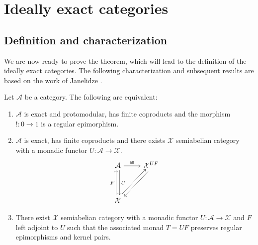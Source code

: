 \chapter{Ideally exact categories}

\fontsize{12}{14.5}\selectfont

\section{Definition and characterization}

We are now ready to prove the theorem, which will lead to the definition of the ideally exact categories. The following characterization and subsequent results are based on the work of Janelidze \cite{Janelidze2024}.

\begin{mainbox}{}
    \begin{theo}\label{Ideally exact categories}
        Let $\mathcal{A}$ be a category. The following are equivalent:
        \begin{enumerate}
            \item $\mathcal{A}$ is exact and protomodular, has finite coproducts and the morphism $!:0 \to 1$ is a regular epimorphism.
            \item $\mathcal{A}$ is exact, has finite coproducts and there exists $\mathcal{X}$ semiabelian category with a monadic functor $U: \mathcal{A} \to \mathcal{X}$.
            \[
\begin{tikzcd}
    \mathcal{A} \arrow[dd, "U", shift left] \arrow[r, "\cong"]      & \mathcal{X}^{UF} \arrow[ldd, shift left] \\
                                                                    &                                          \\
    \mathcal{X} \arrow[uu, "F", shift left] \arrow[ruu, shift left] &                                         
    \end{tikzcd}
            \]
            \item There exist $\mathcal{X}$ semiabelian category with a monadic functor $U: \mathcal{A} \to \mathcal{X}$ and $F$ left adjoint to $U$ such that the associated monad $T=UF$ preserves regular epimorphisms and kernel pairs.
        \end{enumerate}
    \end{theo}
\end{mainbox}

